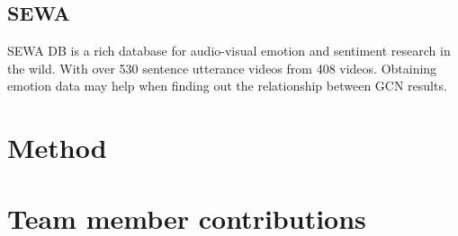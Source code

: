 \documentclass[11pt]{article}
\begin{document}
\subsection{SEWA}
SEWA DB is a rich database for audio-visual emotion and sentiment research in the wild. With over 530 sentence utterance videos from 408 videos. Obtaining emotion data may help when finding out the relationship between GCN results.

\section{Method}


\cite{yin2021contrastive}
\section{Team member contributions}




\end{document}
